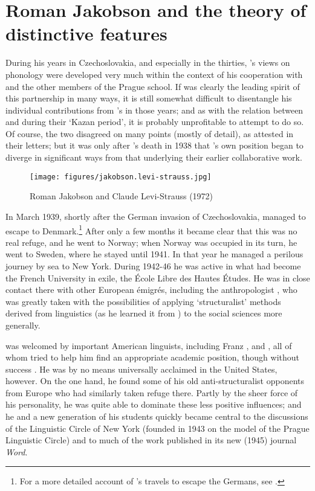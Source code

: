 \chapter{Roman Jakobson and the theory of distinctive features}
\label{ch.jakobson}

During his years in Czechoslovakia, and especially in the thirties,
{\Jakobson}'s views on phonology were developed very much within the
context of his cooperation with {\Trubetzkoy} and the other members of
the Prague school. If {\Jakobson} was clearly the leading spirit of this
partnership in many ways, it is still somewhat difficult to
disentangle his individual contributions from {\Trubetzkoy}'s in those
years; and as with the relation between {\Kruszewski} and {\DeCourtenay} during their `Kazan period', it is probably unprofitable to
attempt to do so. Of course, the two disagreed on many points (mostly
of detail), as attested in their letters; but it was only after
{\Trubetzkoy}'s death in 1938 that {\Jakobson}'s own position began to
diverge in significant ways from that underlying their earlier
collaborative work.

\begin{wrapfigure}[10]{r}{.35\textwidth}
  \texttt{[image: figures/jakobson.levi-strauss.jpg]}
  \caption{Roman Jakobson and Claude Levi-Strauss (1972)}
  \label{fig:ch.jakobson_jakobson_levi-strauss}
\end{wrapfigure}
In March 1939, shortly after the {German} invasion of Czechoslovakia,
{\Jakobson} managed to escape to Denmark.\footnote{For a more detailed
  account of {\Jakobson}'s travels to escape the Germans, see
  \citealt{efj97:jakobson}.} After only a few months it became clear
that this was no real refuge, and he went to Norway; when Norway was
occupied in its turn, he went to Sweden, where he stayed until
1941. In that year he managed a perilous journey by sea to New
York. During 1942-46 he was active in what had become the {French}
University in exile, the École Libre des Hautes Études. He was in
close contact there with other European émigrés, including the
anthropologist , who was greatly taken with the
possibilities of applying `structuralist' methods derived from
linguistics (as he learned it from {\Jakobson}) to the social sciences
more generally.

{\Jakobson} was welcomed by important American linguists, including Franz
{\Boas},  and , all of whom tried to help
him find an appropriate academic position, though without success
\citep{swiggers91-93:jakobson}.  He was by no means universally
acclaimed in the United States, however. On the one hand, he found
some of his old anti-structuralist opponents from Europe who had
similarly taken refuge there. Partly by the sheer force of his
personality, he was quite able to dominate these less positive
influences; and he and a new generation of his students quickly became
central to the discussions of the {Linguistic Circle of New York}
(founded in 1943 on the model of the Prague Linguistic Circle) and to
much of the work published in its new (1945) journal \textsl{Word}.

